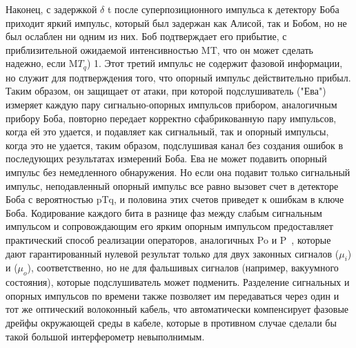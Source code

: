Наконец, с задержкой $\delta$ t после суперпозиционного импульса к детектору Боба приходит яркий импульс, который был задержан как Алисой, так и Бобом, но не был ослаблен ни одним из них. Боб подтверждает его прибытие, с приблизительной ожидаемой интенсивностью MT, что он может сделать надежно, если M$T_q$) 1. Этот третий импульс не содержит фазовой информации, но служит для подтверждения того, что опорный импульс действительно прибыл. Таким образом, он защищает от атаки, при которой подслушиватель ("Ева") измеряет каждую пару сигнально-опорных импульсов прибором, аналогичным прибору Боба, повторно передает корректно сфабрикованную пару импульсов, когда ей это удается, и подавляет как сигнальный, так и опорный импульсы, когда это не удается, таким образом, подслушивая канал без создания ошибок в последующих результатах измерений Боба. Ева не может подавить опорный импульс без немедленного обнаружения. Но если она подавит только сигнальный импульс, неподавленный опорный импульс все равно вызовет счет в детекторе Боба с вероятностью pTq, и половина этих счетов приведет к ошибкам в ключе Боба.
Кодирование каждого бита в разнице фаз между слабым сигнальным импульсом и сопровождающим его ярким опорным импульсом предоставляет практический способ реализации операторов, аналогичных Po и P~, которые дают гарантированный нулевой результат только для двух законных сигналов ($\mu_i$) и ($\mu_o$), соответственно, но не для фальшивых сигналов (например, вакуумного состояния), которые подслушиватель может подменить. Разделение сигнальных и опорных импульсов по времени также позволяет им передаваться через один и тот же оптический волоконный кабель, что автоматически компенсирует фазовые дрейфы окружающей среды в кабеле, которые в противном случае сделали бы такой большой интерферометр невыполнимым.

